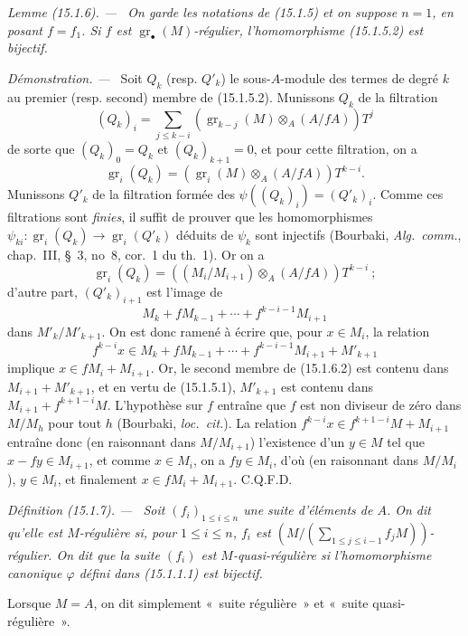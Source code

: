 \documentclass[10pt,oneside]{book}
\makeatletter
\newcommand{\gr}{\operatorname{gr}}
\newcommand{\setmanualcurrentlabel}[1]{\def\@currentlabel{#1}}
\newcommand{\oldpage}[2][]{%
  \setcounter{footnote}{0}%
  \marginpar{\scriptsize\textbf{#1}~|~#2}\ignorespaces}
\newenvironment{definition}[1][]{%
  \setmanualcurrentlabel{#1}\par\medskip\noindent\itshape Définition (#1). ---\ }{\par}
\newenvironment{lemma}[1][]{%
  \setmanualcurrentlabel{#1}\par\medskip\noindent\itshape Lemme (#1). ---\ }{\par}
\newenvironment{proof}{%
  \par\medskip\noindent\textit{Démonstration. ---\ }}{\par}
\makeatother
\begin{document}
\begin{lemma}[15.1.6]
\label{0.15.1.6-fr}
On garde les notations de (15.1.5) et on suppose $n=1$, en posant $f=f_1$. Si
$f$ est $\gr_\bullet(M)$-régulier, l'homomorphisme (15.1.5.2) est bijectif.
\end{lemma}

\begin{proof}
Soit $Q_k$ (resp. $Q'_k$) le sous-$A$-module des termes de degré $k$ au
premier (resp. second) membre de (15.1.5.2). Munissons $Q_k$ de la filtration
\[
  (Q_k)_i=\sum_{j\leq k-i}
  (\gr_{k-j}(M)\otimes_A(A/fA))T^j
  \tag{15.1.6.1}\label{0.15.1.6.1-fr}
\]
de sorte que $(Q_k)_0=Q_k$ et $(Q_k)_{k+1}=0$, et pour cette filtration, on a
\[
  \gr_i(Q_k)=(\gr_i(M)\otimes_A(A/fA))T^{k-i}.
\]
Munissons $Q'_k$ de la filtration formée des
$\psi((Q_k)_i)=(Q'_k)_i$. Comme ces filtrations sont \emph{finies}, il suffit
de prouver que les homomorphismes
$\psi_{ki}:\gr_i(Q_k)\to\gr_i(Q'_k)$ déduits de $\psi_k$ sont injectifs
(Bourbaki, \emph{Alg.~comm.}, chap.~III, \S~3, no~8, cor.~1 du th.~1). Or on
a
\[
  \gr_i(Q_k)=((M_i/M_{i+1})\otimes_A(A/fA))T^{k-i}~;
\]
d'autre part, $(Q'_k)_{i+1}$ est l'image de
\[
  M_k+fM_{k-1}+\cdots+f^{k-i-1}M_{i+1}
\]
\oldpage[0\textsubscript{IV-1}]{15}
dans $M'_k/M'_{k+1}$. On est donc ramené à écrire que, pour $x\in M_i$, la
relation
\[
  f^{k-i}x\in M_k+fM_{k-1}+\cdots+
  f^{k-i-1}M_{i+1}+M'_{k+1}
  \tag{15.1.6.2}\label{0.15.1.6.2-fr}
\]
implique $x\in fM_i+M_{i+1}$. Or, le second membre de (15.1.6.2) est contenu
dans $M_{i+1}+M'_{k+1}$, et en vertu de (15.1.5.1), $M'_{k+1}$ est contenu
dans $M_{i+1}+f^{k+1-i}M$. L'hypothèse sur $f$ entraîne que $f$ est non
diviseur de zéro dans $M/M_h$ pour tout $h$ (Bourbaki, \emph{loc.~cit.}). La
relation $f^{k-i}x\in f^{k+1-i}M+M_{i+1}$ entraîne donc (en raisonnant dans
$M/M_{i+1}$) l'existence d'un $y\in M$ tel que $x-fy\in M_{i+1}$, et comme
$x\in M_i$, on a $fy\in M_i$, d'où (en raisonnant dans $M/M_i$), $y\in M_i$,
et finalement $x\in fM_i+M_{i+1}$. C.Q.F.D.
\end{proof}

\begin{definition}[15.1.7]
\label{0.15.1.7-fr}
Soit $(f_i)_{1\leq i\leq n}$ une suite d'éléments de $A$. On dit qu'elle est
\emph{$M$-régulière} si, pour $1\leq i\leq n$, $f_i$ est
$\left(M/(\sum_{1\leq j\leq i-1}f_jM)\right)$-régulier. On dit que la suite
$(f_i)$ est \emph{$M$-quasi-régulière} si
l'homomorphisme canonique $\varphi$ défini dans (15.1.1.1) est bijectif.

Lorsque $M=A$, on dit simplement «~suite régulière~» et
«~suite quasi-régulière~».
\end{definition}
\end{document}
